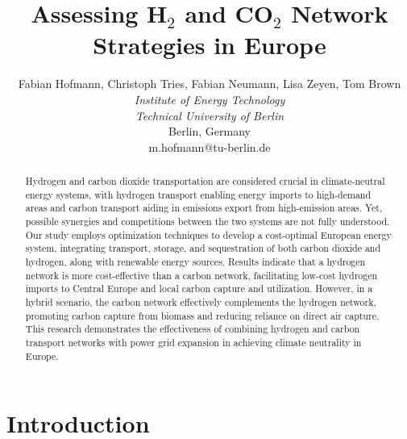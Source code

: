 \documentclass[twocolumn]{article}
\newcommand{\COtwo}{CO$_2$}
\newcommand{\Htwo}{H$_2$}
\begin{document}

\title{Assessing \Htwo{} and \COtwo{} Network Strategies in Europe}

\author{
    Fabian Hofmann, Christoph Tries, Fabian Neumann, Lisa Zeyen, Tom Brown \\
    \textit{Institute of Energy Technology} \\
    \textit{Technical University of Berlin}\\
    Berlin, Germany \\
    m.hofmann@tu-berlin.de
}


\maketitle

\begin{abstract}
    Hydrogen and carbon dioxide transportation are considered crucial in climate-neutral energy systems, with hydrogen transport enabling energy imports to high-demand areas and carbon transport aiding in emissions export from high-emission areas. Yet, possible synergies and competitions between the two systems are not fully understood. Our study employs optimization techniques to develop a cost-optimal European energy system, integrating transport, storage, and sequestration of both carbon dioxide and hydrogen, along with renewable energy sources. Results indicate that a hydrogen network is more cost-effective than a carbon network, facilitating low-cost hydrogen imports to Central Europe and local carbon capture and utilization. However, in a hybrid scenario, the carbon network effectively complements the hydrogen network, promoting carbon capture from biomass and reducing reliance on direct air capture. This research demonstrates the effectiveness of combining hydrogen and carbon transport networks with power grid expansion in achieving climate neutrality in Europe.
\end{abstract}


\section{Introduction}
\end{document}

